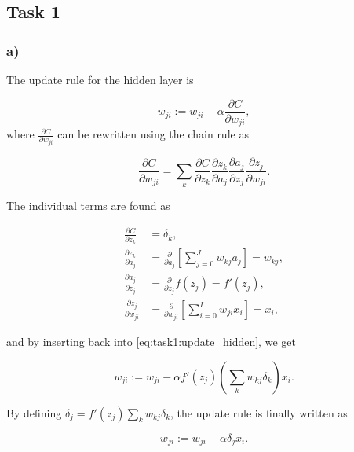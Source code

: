 \subsection*{Task 1}

\subsubsection*{a)}

The update rule for the hidden layer is

\begin{equation}
  w_{ji} := w_{ji} - \alpha \frac{\partial C}{\partial w_{ji}},
  \label{eq:task1:update_hidden}
\end{equation}
where $\frac{\partial C}{\partial w_{ji}}$ can be rewritten using the chain rule as

\begin{equation*}
  \frac{\partial C}{\partial w_{ji}} = \sum_{k} \frac{\partial C}{\partial z_k} \frac{\partial z_k}{\partial a_j} \frac{\partial a_j}{\partial z_j} \frac{\partial z_j}{\partial w_{ji}}.
\end{equation*}

The individual terms are found as

\begin{align*}
  \frac{\partial C}{\partial z_k}       &= \delta_k, \\
  \frac{\partial z_k}{\partial a_j}     &= \frac{\partial}{\partial a_j}\left[\sum_{j=0}^{J} w_{kj} a_j  \right] = w_{kj}, \\
  \frac{\partial a_j}{\partial z_j}     &= \frac{\partial}{\partial z_j} f(z_j) = f'(z_j), \\
  \frac{\partial z_j}{\partial w_{ji}}  &= \frac{\partial}{\partial w_{ji}}\left[\sum_{i=0}^{I} w_{ji} x_i  \right] = x_i,
\end{align*}

and by inserting back into \cref{eq:task1:update_hidden}, we get

\begin{equation*}
  w_{ji} := w_{ji} - \alpha f'(z_j) \left(\sum_k w_{kj} \delta_k \right) x_i.
\end{equation*}

By defining $\delta_j = f'(z_j) \sum_k w_{kj} \delta_k$, the update rule is finally written as

\begin{equation*}
  w_{ji} := w_{ji} - \alpha \delta_j x_i.
\end{equation*}



